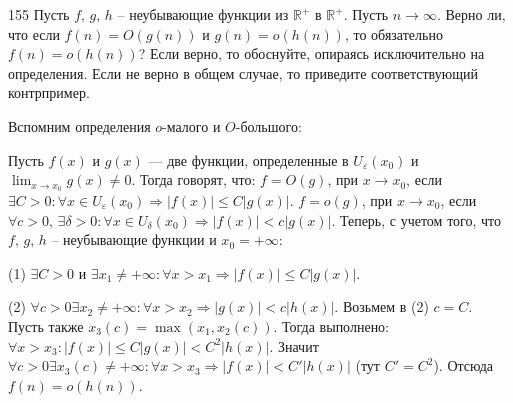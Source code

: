 \begin{task}{155}
Пусть $f,\,g,\,h$ -- неубывающие функции из $\mathbb{R}^+$ в $\mathbb{R}^+$. Пусть $n \to \infty$. Верно ли, что если $f(n)=O(g(n))$ и $g(n)=o(h(n))$, то обязательно $f(n)=o(h(n))$? Если верно, то обоснуйте, опираясь исключительно на определения. Если не верно в общем случае, то приведите соответствующий контрпример.
\end{task}

\begin{solution}
Вспомним определения $o$-малого и $O$-большого: \par
Пусть $f(x)$ и $g(x)$ — две функции, определенные в $U_\varepsilon(x_0)$ и $\lim_{x\to x_0} g(x) \neq 0$. Тогда говорят, что: \newline
$f = O(g)$, при $x \to x_0$, если $\exists C > 0 : \forall x \in U_\varepsilon(x_0) \Rightarrow |f(x)| \leq C|g(x)|$.\newline
$f = o(g)$, при $x \to x_0$, если $\forall c > 0,\, \exists \delta > 0 : \forall x \in U_\delta(x_0) \Rightarrow |f(x)| < c|g(x)|$.
\newline \newline
Теперь, с учетом того, что $f,\,g,\,h$ -- неубывающие функции и $x_0 = + \infty$:\par
(1) $\exists C > 0$ и $\exists x_1 \neq + \infty : \forall x > x_1 \Rightarrow |f(x)| \leq C|g(x)|$.\par
(2) $\forall c > 0 \exists x_2 \neq + \infty : \forall x > x_2 \Rightarrow |g(x)| < c|h(x)|$.\newline
Возьмем в (2) $c = C$. Пусть также $x_3(c) = \max(x_1, x_2(c))$. Тогда выполнено: $\forall x > x_3: |f(x)| \leq C|g(x)| < C^2|h(x)|$. \newline
Значит $\forall c > 0 \exists x_3(c) \neq + \infty : \forall x > x_3 \Rightarrow |f(x)| < C'|h(x)|$ (тут $C' = C^2$).\newline
Отсюда $f(n)=o(h(n))$.
\end{solution}